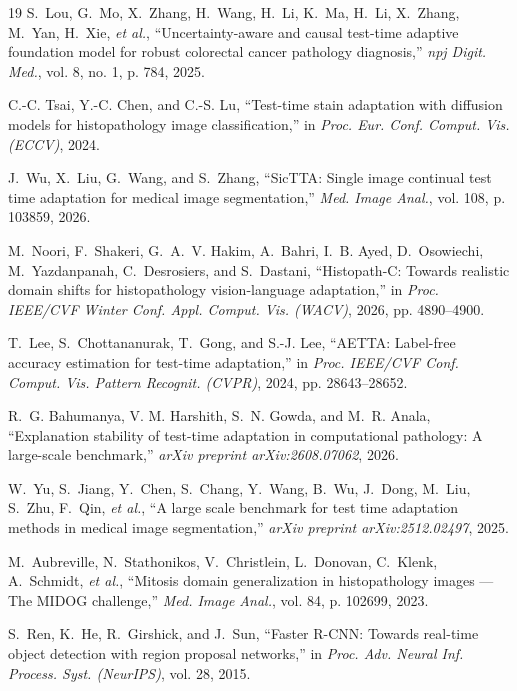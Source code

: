 \documentclass[conference]{IEEEtran}
\begin{document}
\begin{thebibliography}{19}
S.~Lou, G.~Mo, X.~Zhang, H.~Wang, H.~Li, K.~Ma, H.~Li, X.~Zhang, M.~Yan, H.~Xie, \textit{et al.}, ``Uncertainty-aware and causal test-time adaptive foundation model for robust colorectal cancer pathology diagnosis,'' \textit{npj Digit. Med.}, vol. 8, no. 1, p. 784, 2025.

C.-C. Tsai, Y.-C. Chen, and C.-S. Lu, ``Test-time stain adaptation with diffusion models for histopathology image classification,'' in \textit{Proc. Eur. Conf. Comput. Vis. (ECCV)}, 2024.

J.~Wu, X.~Liu, G.~Wang, and S.~Zhang, ``{SicTTA}: Single image continual test time adaptation for medical image segmentation,'' \textit{Med. Image Anal.}, vol. 108, p. 103859, 2026.

M.~Noori, F.~Shakeri, G.~A.~V. Hakim, A.~Bahri, I.~B. Ayed, D.~Osowiechi, M.~Yazdanpanah, C.~Desrosiers, and S.~Dastani, ``{Histopath-C}: Towards realistic domain shifts for histopathology vision-language adaptation,'' in \textit{Proc. IEEE/CVF Winter Conf. Appl. Comput. Vis. (WACV)}, 2026, pp. 4890--4900.

T.~Lee, S.~Chottananurak, T.~Gong, and S.-J. Lee, ``{AETTA}: Label-free accuracy estimation for test-time adaptation,'' in \textit{Proc. IEEE/CVF Conf. Comput. Vis. Pattern Recognit. (CVPR)}, 2024, pp. 28643--28652.

R.~G. Bahumanya, V. M. Harshith, S.~N. Gowda, and M.~R. Anala, ``Explanation stability of test-time adaptation in computational pathology: A large-scale benchmark,'' \textit{arXiv preprint arXiv:2608.07062}, 2026.

W.~Yu, S.~Jiang, Y.~Chen, S.~Chang, Y.~Wang, B.~Wu, J.~Dong, M.~Liu, S.~Zhu, F.~Qin, \textit{et al.}, ``A large scale benchmark for test time adaptation methods in medical image segmentation,'' \textit{arXiv preprint arXiv:2512.02497}, 2025.

M.~Aubreville, N.~Stathonikos, V.~Christlein, L.~Donovan, C.~Klenk, A.~Schmidt, \textit{et al.}, ``Mitosis domain generalization in histopathology images --- The {MIDOG} challenge,'' \textit{Med. Image Anal.}, vol. 84, p. 102699, 2023.

S.~Ren, K.~He, R.~Girshick, and J.~Sun, ``Faster {R-CNN}: Towards real-time object detection with region proposal networks,'' in \textit{Proc. Adv. Neural Inf. Process. Syst. (NeurIPS)}, vol. 28, 2015.
\end{thebibliography}
\end{document}
